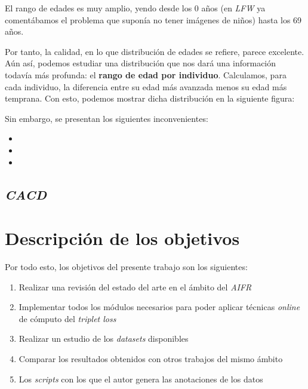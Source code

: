 El rango de edades es muy amplio, yendo desde los 0 años (en \textit{LFW} ya comentábamos el problema que suponía no tener imágenes de niños) hasta los 69 años.

Por tanto, la calidad, en lo que distribución de edades se refiere, parece excelente. Aún así, podemos estudiar una distribución que nos dará una información todavía más profunda: el \textbf{rango de edad por individuo}. Calculamos, para cada individuo, la diferencia entre su edad más avanzada menos su edad más temprana. Con esto, podemos mostrar dicha distribución en la siguiente figura:


Sin embargo, se presentan los siguientes inconvenientes:

\begin{itemize}
    \item
    \item
    \item
\end{itemize}





\subsection{\textit{CACD}}

\section{Descripción de los objetivos}

Por todo esto, los objetivos del presente trabajo son los siguientes:

\begin{enumerate}
    \item Realizar una revisión del estado del arte en el ámbito del \textit{AIFR}
    \item Implementar todos los módulos necesarios para poder aplicar técnicas \textit{online} de cómputo del \textit{triplet loss}
    \item Realizar un estudio de los \textit{datasets} disponibles
    \item Comparar los resultados obtenidos con otros trabajos del mismo ámbito
    \item Los \textit{scripts} con los que el autor genera las anotaciones de los datos
\end{enumerate}

